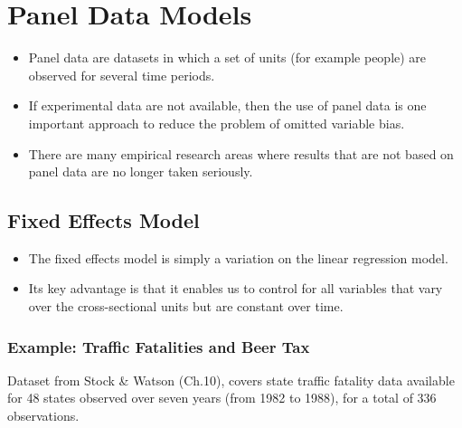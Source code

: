 \documentclass[]{article}
\theoremstyle{definition}
\theoremstyle{definition}
\theoremstyle{remark}
\begin{document}
\section{Panel Data Models}\label{panel-data-models}

\begin{itemize}
\item
  Panel data are datasets in which a set of units (for example people)
  are observed for several time periods.
\item
  If experimental data are not available, then the use of panel data is
  one important approach to reduce the problem of omitted variable bias.
\item
  There are many empirical research areas where results that are not
  based on panel data are no longer taken seriously.
\end{itemize}

\subsection{Fixed Effects Model}\label{fixed-effects-model}

\begin{itemize}
\item
  The fixed effects model is simply a variation on the linear regression
  model.
\item
  Its key advantage is that it enables us to control for all variables
  that vary over the cross-sectional units but are constant over time.
\end{itemize}

\subsubsection{Example: Traffic Fatalities and Beer
Tax}\label{example-traffic-fatalities-and-beer-tax}

Dataset from Stock \& Watson (Ch.10), covers state traffic fatality data
available for 48 states observed over seven years (from 1982 to 1988),
for a total of 336 observations.
\end{document}
